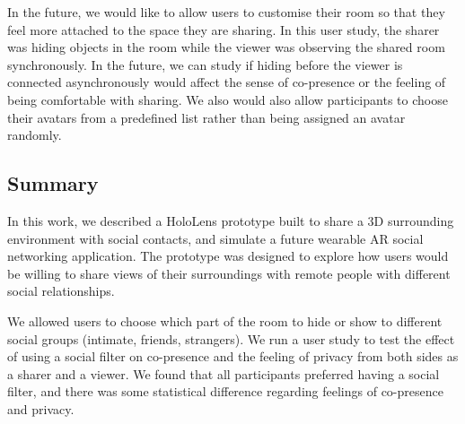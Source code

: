 In the future, we would like to allow users to customise their room so that they feel more attached to the space they are sharing. In this user study, the sharer was hiding objects in the room while the viewer was observing the shared room synchronously. In the future, we can study if hiding before the viewer is connected asynchronously would affect the sense of co-presence or the feeling of being comfortable with sharing. We also would also allow participants to choose their avatars from a predefined list rather than being assigned an avatar randomly.   

\subsection{Summary}

In this work, we described a HoloLens prototype built to share a 3D surrounding environment with social contacts, and simulate a future wearable AR social networking application. The prototype was designed to explore how users would be willing to share views of their surroundings with remote people with different social relationships. 

We allowed users to choose which part of the room to hide or show to different social groups (intimate, friends, strangers). We run a user study to test the effect of using a social filter on co-presence and the feeling of privacy from both sides as a sharer and a viewer. We found that all participants preferred having a social filter, and there was some statistical difference regarding feelings of co-presence and privacy. 

